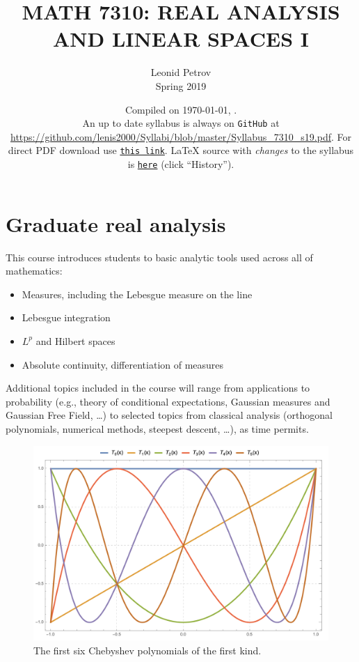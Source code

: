 \documentclass[oneside,11pt]{amsart}
\begin{document}
\title[MATH 7310: REAL ANALYSIS AND LINEAR SPACES I]{MATH 7310: REAL ANALYSIS AND LINEAR SPACES I}
\author{Leonid Petrov\\Spring 2019}
\date{Compiled on \today, \currenttime.\\An up to date syllabus is always on \texttt{GitHub} at \url{https://github.com/lenis2000/Syllabi/blob/master/Syllabus_7310_s19.pdf}. For direct PDF download use \href{https://github.com/lenis2000/Syllabi/raw/master/Syllabus_7310_s19.pdf}{\texttt{this link}}.
	\LaTeX{} source with \textit{changes} to the syllabus is \href{https://github.com/lenis2000/Syllabi/blob/master/Syllabus_7310_s19.tex}{\texttt{here}}
(click ``History'').}
\maketitle

\bigskip

\section{Graduate real analysis}
\bigskip

This course introduces students to basic analytic tools used across all of mathematics:
\begin{itemize}
	\item Measures, including the Lebesgue measure on the line
	\item Lebesgue integration
	\item $L^p$ and Hilbert spaces
	\item Absolute continuity, differentiation of measures
\end{itemize}

Additional topics included in the course will range from applications to 
probability (e.g., theory of conditional expectations, Gaussian measures and Gaussian Free Field, \ldots)
to selected topics from classical analysis (orthogonal polynomials, numerical methods, steepest descent, \ldots),
as time permits.


\begin{figure}[h]
	\includegraphics[height=.32\textwidth]{img/chebyshev.png}
	\caption{The first six Chebyshev polynomials of the first kind.}
\end{figure}
\end{document}
